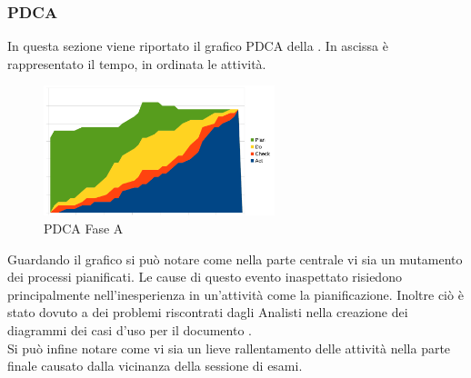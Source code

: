 		\subsubsection{PDCA}
			In questa sezione viene riportato il grafico PDCA della . In ascissa è rappresentato il tempo, in ordinata le attività.
			\begin{figure}[H]
				\centering
				\includegraphics[width=0.6\textwidth]{PianoDiQualifica/Pics/GraficoPDCAFaseA.pdf}
				\caption{PDCA Fase A}
			\end{figure}
			Guardando il grafico si può notare come nella parte centrale vi sia un mutamento dei processi pianificati. Le cause di questo evento 
			inaspettato	risiedono principalmente nell'inesperienza in un'attività come la pianificazione. Inoltre ciò è stato dovuto a dei problemi 
			riscontrati dagli Analisti nella creazione dei diagrammi dei casi d'uso per il documento .\\
			Si può infine notare come vi sia un lieve rallentamento delle attività nella parte finale causato dalla vicinanza della sessione di esami.